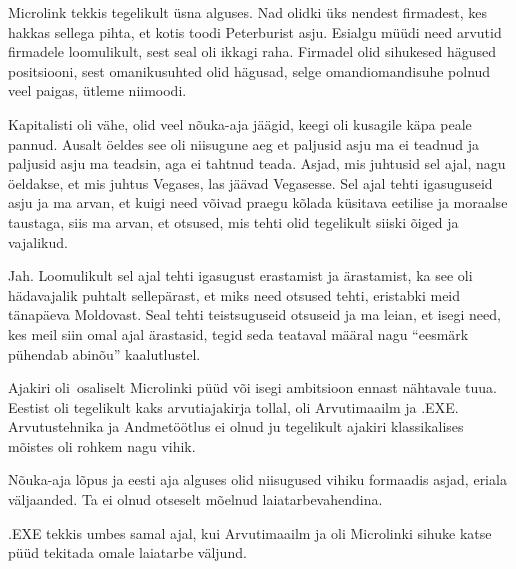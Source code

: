 Microlink tekkis tegelikult üsna alguses. Nad olidki üks nendest firmadest, kes 
hakkas sellega pihta, et kotis toodi Peterburist asju. Esialgu müüdi need 
arvutid firmadele loomulikult, sest seal oli ikkagi raha. Firmadel olid 
sihukesed hägused positsiooni, sest omanikusuhted olid hägusad, selge 
omandiomandisuhe polnud veel paigas, ütleme niimoodi.


Kapitalisti oli vähe, olid veel nõuka-aja jäägid, keegi oli kusagile käpa peale 
pannud. Ausalt öeldes see oli niisugune aeg et paljusid asju ma ei teadnud ja 
paljusid asju ma teadsin, aga ei tahtnud teada. Asjad, mis juhtusid sel ajal, 
nagu öeldakse, et mis juhtus Vegases, las jäävad Vegasesse. Sel ajal tehti 
igasuguseid asju ja ma arvan, et kuigi need võivad praegu kõlada küsitava 
eetilise ja moraalse taustaga, siis ma arvan, et otsused, mis tehti olid 
tegelikult siiski õiged ja vajalikud.


Jah. Loomulikult sel ajal tehti igasugust erastamist ja ärastamist, ka see oli 
hädavajalik puhtalt sellepärast, et miks need otsused tehti, eristabki meid 
tänapäeva  Moldovast. Seal tehti teistsuguseid otsuseid ja ma leian, et isegi 
need, kes meil siin omal ajal ärastasid, tegid seda teataval määral nagu 
\enquote{eesmärk pühendab abinõu} kaalutlustel.


Ajakiri oli osaliselt Microlinki püüd või isegi ambitsioon ennast nähtavale 
tuua.  Eestist oli tegelikult kaks arvutiajakirja tollal, oli 
Arvutimaailm ja .EXE. Arvutustehnika ja 
Andmetöötlus ei olnud ju tegelikult ajakiri klassikalises mõistes oli rohkem 
nagu vihik.

Nõuka-aja lõpus ja eesti  aja alguses olid niisugused vihiku formaadis asjad, 
eriala väljaanded. Ta ei olnud otseselt mõelnud laiatarbevahendina.

.EXE tekkis umbes samal ajal, kui Arvutimaailm ja oli Microlinki sihuke katse 
püüd tekitada omale laiatarbe väljund.


